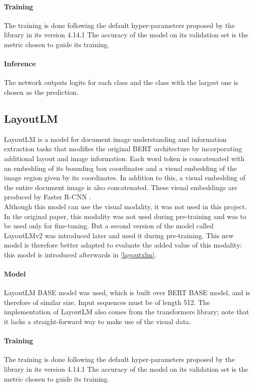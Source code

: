 \paragraph{Training}
The training is done following the default hyper-parameters proposed by the library in its version 4.14.1 The accuracy of the model on its validation set is the metric chosen to guide its training.

\paragraph{Inference}
The network outputs logits for each class and the class with the largest one is chosen as the prediction.

\subsection{LayoutLM}
\label{layoutlm}
LayoutLM \citep{xu_layoutlm_2019} is a model for document image understanding and information extraction tasks that modifies the original BERT architecture by incorporating additional layout and image information. Each word token is concatenated with an embedding of its bounding box coordinates and a visual embedding of the image region given by its coordinates. In addition to this, a visual embedding of the entire document image is also concatenated. These visual embeddings are produced by Faster R-CNN \citep{ren_faster_2016}.\\
Although this model can use the visual modality, it was not used in this project. In the original paper, this modality was not used during pre-training and was to be used only for fine-tuning. But a second version of the model called LayoutLMv2 \citep{xu_layoutlmv2_2021} was introduced later and used it during pre-training. This new model is therefore better adapted to evaluate the added value of this modality: this model is introduced afterwards in \ref{layoutxlm}. 

\paragraph{Model}
LayoutLM BASE model was used, which is built over BERT BASE model, and is therefore of similar size. Input sequences must be of length 512. The implementation of LayoutLM also comes from the transformers library; note that it lacks a straight-forward way to make use of the visual data.

\paragraph{Training}
The training is done following the default hyper-parameters proposed by the library in its version 4.14.1 The accuracy of the model on its validation set is the metric chosen to guide its training.

